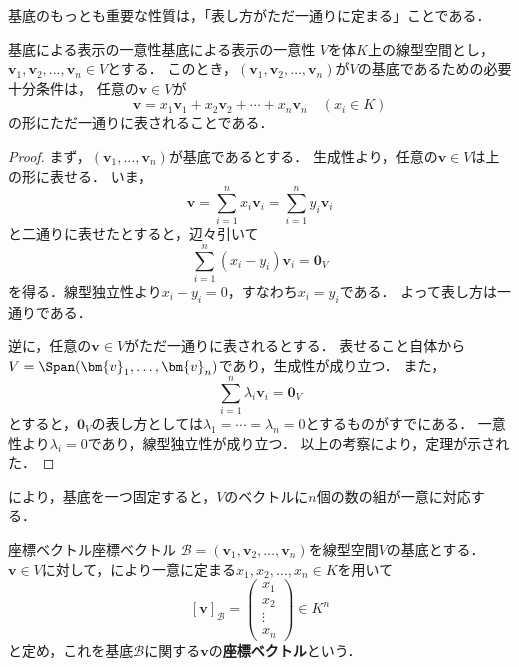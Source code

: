 基底のもっとも重要な性質は，「表し方がただ一通りに定まる」ことである．

\begin{theorem}{基底による表示の一意性}{基底による表示の一意性}
  $V$を体$K$上の線型空間とし，$\bm{v}_1, \bm{v}_2, \dots, \bm{v}_n \in V$とする．
  このとき，$(\bm{v}_1, \bm{v}_2, \dots, \bm{v}_n)$が$V$の基底であるための必要十分条件は，
  任意の$\bm{v} \in V$が
  \[
    \bm{v} = x_1 \bm{v}_1 + x_2 \bm{v}_2 + \cdots + x_n \bm{v}_n
    \quad (x_i \in K)
  \]
  の形にただ一通りに表されることである．
\end{theorem}

\begin{leftbar}
\begin{proof}
  まず，$(\bm{v}_1, \dots, \bm{v}_n)$が基底であるとする．
  生成性より，任意の$\bm{v} \in V$は上の形に表せる．
  いま，
  \[
    \bm{v} = \sum_{i=1}^{n} x_i \bm{v}_i = \sum_{i=1}^{n} y_i \bm{v}_i
  \]
  と二通りに表せたとすると，辺々引いて
  \[
    \sum_{i=1}^{n} (x_i - y_i) \bm{v}_i = \bm{0}_V
  \]
  を得る．線型独立性より$x_i - y_i = 0$，すなわち$x_i = y_i$である．
  よって表し方は一通りである．

  逆に，任意の$\bm{v} \in V$がただ一通りに表されるとする．
  表せること自体から$V = \Span(\bm{v}_1, \dots, \bm{v}_n)$であり，生成性が成り立つ．
  また，
  \[
    \sum_{i=1}^{n} \lambda_i \bm{v}_i = \bm{0}_V
  \]
  とすると，$\bm{0}_V$の表し方としては$\lambda_1 = \cdots = \lambda_n = 0$とするものがすでにある．
  一意性より$\lambda_i = 0$であり，線型独立性が成り立つ．
  以上の考察により，定理が示された．
\end{proof}
\end{leftbar}

により，基底を一つ固定すると，$V$のベクトルに$n$個の数の組が一意に対応する．

\begin{definition}{座標ベクトル}{座標ベクトル}
  $\mathcal{B} = (\bm{v}_1, \bm{v}_2, \dots, \bm{v}_n)$を線型空間$V$の基底とする．
  $\bm{v} \in V$に対して，により一意に定まる$x_1, x_2, \dots, x_n \in K$を用いて
  \[
    [\bm{v}]_{\mathcal{B}}
    = \begin{pmatrix} x_1 \\ x_2 \\ \vdots \\ x_n \end{pmatrix} \in K^n
  \]
  と定め，これを基底$\mathcal{B}$に関する$\bm{v}$の\textbf{座標ベクトル}という．
\end{definition}

